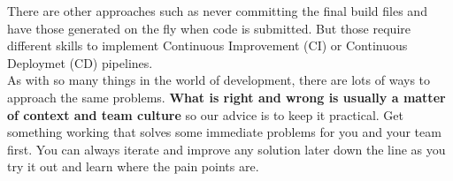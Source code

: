 There are other approaches such as never committing the final build files and have those generated on the fly when code is submitted. But those require different skills to implement Continuous Improvement (CI) or Continuous Deploymet (CD) pipelines. 
\\

As with so many things in the world of development, there are lots of ways to approach the same problems. \textbf{What is right and wrong is usually a matter of context and team culture} so our advice is to keep it practical. Get something working that solves some immediate problems for you and your team first. You can always iterate and improve any solution later down the line as you try it out and learn where the pain points are.
\\